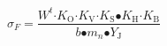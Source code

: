 \begin{equation}
{\sigma }_F\mathrm{=}\frac{W^t\mathrm{\cdot }K_{\mathrm{O}}\mathrm{\cdot }K_{\mathrm{V}}\mathrm{\cdot }K_{\mathrm{S}}\mathrm{\bullet }K_{\mathrm{H}}\mathrm{\cdot }K_{\mathrm{B}}}{b\mathrm{\bullet }m_n\mathrm{\bullet }Y_{\mathrm{J}}}
\end{equation}